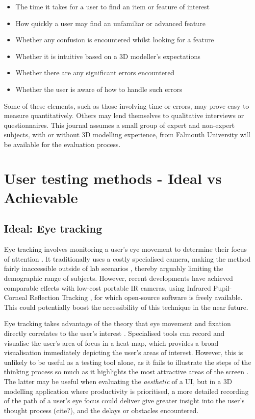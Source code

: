 \documentclass{scrartcl}
\begin{document}
\begin{itemize}
	\item The time it takes for a user to find an item or feature of interest
	\item How quickly a user may find an unfamiliar or advanced feature
	\item Whether any confusion is encountered whilst looking for a feature
	\item Whether it is intuitive based on a 3D modeller's expectations
	\item Whether there are any significant errors encountered
	\item Whether the user is aware of how to handle such errors
\end{itemize}

Some of these elements, such as those involving time or errors, may prove easy to measure quantitatively. Others may lend themselves to qualitative interviews or questionnaires. This journal assumes a small group of expert and non-expert subjects, with or without 3D modelling experience, from Falmouth University will be available for the evaluation process.

\section{User testing methods - Ideal vs Achievable}
\subsection{Ideal: Eye tracking}
Eye tracking involves monitoring a user's eye movement to determine their focus of attention \cite{poole_eye_2006}. It traditionally uses a costly specialised camera, making the method fairly inaccessible outside of lab scenarios \cite{ho_low_2014}, thereby arguably limiting the demographic range of subjects. However, recent developments have achieved comparable effects with low-cost portable IR cameras, using Infrared Pupil-Corneal Reflection Tracking \cite{majaranta_chapter_2014} \cite{lowcosttracker}, for which open-source software \cite{ho_low_2014} is freely available. This could potentially boost the accessibility of this technique in the near future.

Eye tracking takes advantage of the theory that eye movement and fixation directly correlates to the user's interest \cite{poole_eye_2006}. Specialised tools can record and visualise the user's area of focus in a heat map, which provides a broad visualisation immediately depicting the user's areas of interest. However, this is unlikely to be useful as a testing tool alone, as it fails to illustrate the steps of the thinking process so much as it highlights the most attractive areas of the screen \cite{gazepatterns}. The latter may be useful when evaluating the \textit{aesthetic} of a UI, but in a 3D modelling application where productivity is prioritised, a more detailed recording of the path of a user's eye focus could deliver give greater insight into the user's thought process (cite?), and the delays or obstacles encountered.
\end{document}
